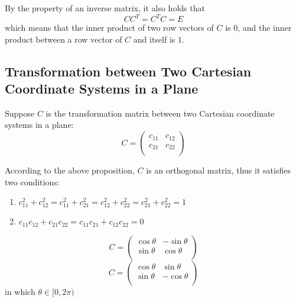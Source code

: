 \documentclass[onecolumn]{ctexart}
\begin{document}
By the property of an inverse matrix, it also holds that
\[
  C C^T = C^T C = E
\]
which means that the inner product of two row vectors of $C$ is $0$, and the 
inner product between a row vector of $C$ and itself is $1$.

\subsection{Transformation between Two Cartesian Coordinate Systems in a Plane}

Suppose $C$ is the transformation matrix between two Cartesian coordinate systems in a plane:
\[
  C = 
  \begin{pmatrix}
    c_{11} & c_{12} \\
    c_{21} & c_{22} \\
  \end{pmatrix}
\]

According to the above proposition, $C$ is an orthogonal matrix, thus it 
satisfies two conditions:
\begin{enumerate}
  \item $c_{11}^2 + c_{12}^2 = c_{11}^2 + c_{21}^2 = c_{12}^2 + c_{22}^2 = c_{21}^2 + c_{22}^2 = 1$
  \item $c_{11} c_{12} + c_{21} c_{22} = c_{11} c_{21} + c_{12} c_{22} = 0$
\end{enumerate}

\[
  C = 
  \begin{pmatrix}
    \cos\theta & -\sin\theta \\
    \sin\theta & \cos\theta \\
  \end{pmatrix}
\]
\[
  C = 
  \begin{pmatrix}
    \cos\theta & \sin\theta \\
    \sin\theta & -\cos\theta \\
  \end{pmatrix} 
\]
in which $\theta \in \lbrack 0, 2\pi)$
\end{document}
